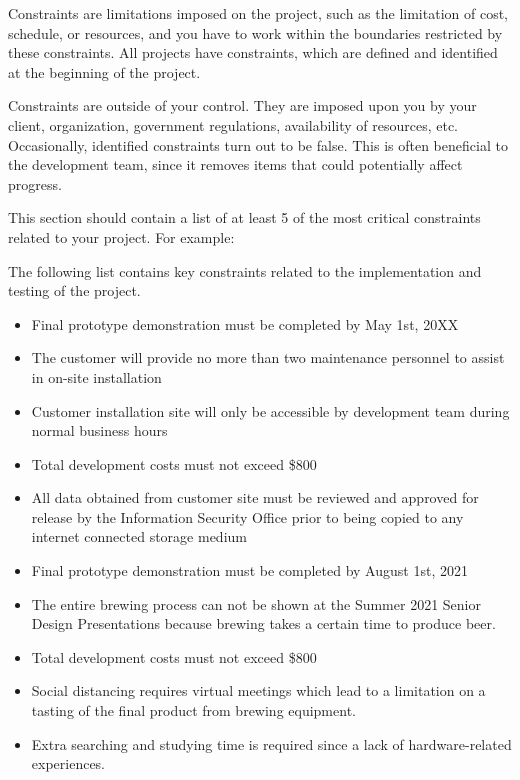 Constraints are limitations imposed on the project, such as the limitation of cost, schedule, or resources, and you have to work within the boundaries restricted by these constraints. All projects have constraints, which are defined and identified at the beginning of the project.

Constraints are outside of your control. They are imposed upon you by your client, organization, government regulations, availability of resources, etc. Occasionally, identified constraints turn out to be false. This is often beneficial to the development team, since it removes items that could potentially affect progress.

This section should contain a list of at least 5 of the most critical constraints related to your project. For example:

The following list contains key constraints related to the implementation and testing of the project.

\begin{itemize}
  \item Final prototype demonstration must be completed by May 1st, 20XX
  \item The customer will provide no more than two maintenance personnel to assist in on-site installation
  \item Customer installation site will only be accessible by development team during normal business hours
  \item Total development costs must not exceed \$800
  \item All data obtained from customer site must be reviewed and approved for release by the Information Security Office prior to being copied to any internet connected storage medium
\end{itemize}

\begin{itemize}
  \item Final prototype demonstration must be completed by August 1st, 2021 
  \item The entire brewing process can not be shown at the Summer 2021 Senior Design Presentations because brewing takes a certain time to produce beer. 
  \item Total development costs must not exceed \$800 
  \item Social distancing requires virtual meetings which lead to a limitation on a tasting of the final product from brewing equipment. 
  \item Extra searching and studying time is required since a lack of hardware-related experiences.
\end{itemize}